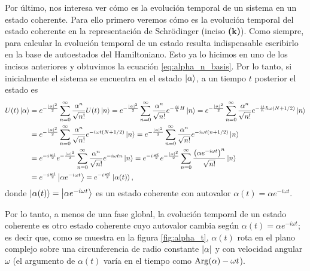 \documentclass[10pt, a4paper]{article}
\newcommand{\wt}{\omega t}
\numberwithin{equation}{subsection}
\begin{document}
Por último, nos interesa ver cómo es la evolución temporal de un sistema en un
estado coherente. Para ello primero veremos cómo es la evolución temporal del
estado coherente en la representación de Schrödinger (inciso \textbf{(k)}).
Como siempre, para calcular la evolución temporal de un estado resulta
indispensable escribirlo en la base de autoestados del Hamiltoniano. Esto ya lo
hicimos en uno de los incisos anteriores y obtuvimos la ecuación
\eqref{eq:alpha_n_basis}. Por lo tanto, si inicialmente el sistema se encuentra
en el estado $\ket{\alpha}$, a un tiempo $t$ posterior el estado es
\begin{align}
  U(t)\ket{\alpha} &= e^{-\frac{\abs{\alpha}^2}{2}} \sum_{n=0}^{\infty}
    \frac{\alpha^n}{\sqrt{n!}} U(t)\ket{n} = 
    e^{-\frac{\abs{\alpha}^2}{2}} \sum_{n=0}^{\infty}
    \frac{\alpha^n}{\sqrt{n!}} e^{-\frac{it}{\hbar}H} \ket{n} = 
    e^{-\frac{\abs{\alpha}^2}{2}} \sum_{n=0}^{\infty}
    \frac{\alpha^n}{\sqrt{n!}} e^{-\frac{it}{\hbar}\hbar\omega\left(N +
    1/2\right)} \ket{n} \nonumber \\
  &= e^{-\frac{\abs{\alpha}^2}{2}} \sum_{n=0}^{\infty}
    \frac{\alpha^n}{\sqrt{n!}} e^{-i\wt\left(N + 1/2\right)} \ket{n}
    = e^{-\frac{\abs{\alpha}^2}{2}} \sum_{n=0}^{\infty}
    \frac{\alpha^n}{\sqrt{n!}} e^{-i\wt\left(n + 1/2\right)} \ket{n} \nonumber
    \\
  &= e^{-i\frac{\wt}{2}} e^{-\frac{\abs{\alpha}^2}{2}} \sum_{n=0}^{\infty}
    \frac{\alpha^n}{\sqrt{n!}} e^{-i\wt n} \ket{n}
    = e^{-i\frac{\wt}{2}} e^{-\frac{\abs{\alpha}^2}{2}} \sum_{n=0}^{\infty}
    \frac{\left(\alpha e^{-i\wt}\right)^n}{\sqrt{n!}} \ket{n} \nonumber \\
  &= e^{-i\frac{\wt}{2}}\ket{\alpha e^{-i\wt}} =
    e^{-i\frac{\wt}{2}}\ket{\alpha(t)},
\end{align}
donde $\ket{\alpha(t)} = \ket{\alpha e^{-i\wt}}$ es un estado coherente con
autovalor $\alpha(t) = \alpha e^{-i\wt}$.

Por lo tanto, a menos de una fase global, la evolución temporal de un estado
coherente es otro estado coherente cuyo autovalor cambia según $\alpha(t) =
\alpha e^{-i\wt}$; es decir que, como se muestra en la figura
\ref{fig:alpha_t}, $\alpha(t)$ rota en el plano complejo sobre una
circunferencia de radio constante $\abs{\alpha}$ y con velocidad angular
$\omega$ (el argumento de $\alpha(t)$ varía en el tiempo como $\Arg(\alpha) -
\wt$). 
\end{document}
